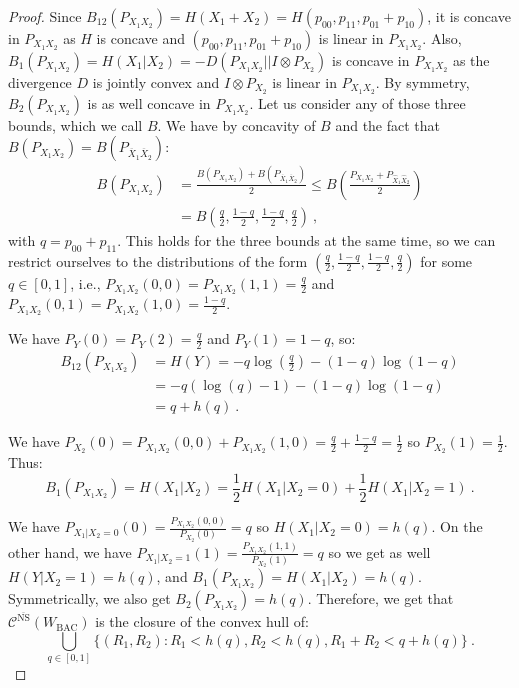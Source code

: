 \begin{proof}
    Since $B_{12}(P_{X_1X_2}) = H(X_1+X_2) = H(p_{00},p_{11},p_{01}+p_{10})$, it is concave in $P_{X_1X_2}$ as $H$ is concave and $(p_{00},p_{11},p_{01}+p_{10})$ is linear in $P_{X_1X_2}$. Also, $B_1(P_{X_1X_2}) = H(X_1|X_2) = -D(P_{X_1X_2} ||I \otimes P_{X_2})$ is concave in $P_{X_1X_2}$  as the divergence $D$ is jointly convex and $I \otimes P_{X_2}$ is linear in $P_{X_1X_2}$. By symmetry, $B_2(P_{X_1X_2})$ is as well concave in $P_{X_1X_2}$. Let us consider any of those three bounds, which we call $B$. We have by concavity of $B$ and the fact that $B(P_{X_1X_2})=B(P_{\overline{X}_1\overline{X}_2})$:
    \begin{equation}
      \begin{aligned}
        B(P_{X_1X_2})& = \frac{B(P_{X_1X_2})+B(P_{\overline{X}_1\overline{X}_2})}{2} \leq B\left(\frac{P_{X_1X_2}+P_{\hat{X}_1\hat{X}_2}}{2}\right)\\
        &= B\left(\frac{q}{2},\frac{1-q}{2},\frac{1-q}{2},\frac{q}{2}\right) \ ,
      \end{aligned}
    \end{equation}
    with $q=p_{00}+p_{11}$. This holds for the three bounds at the same time, so we can restrict ourselves to the distributions of the form $\left(\frac{q}{2},\frac{1-q}{2},\frac{1-q}{2},\frac{q}{2}\right)$ for some $q \in [0,1]$, i.e., $P_{X_1X_2}(0,0) = P_{X_1X_2}(1,1) = \frac{q}{2}$ and $P_{X_1X_2}(0,1) = P_{X_1X_2}(1,0) = \frac{1-q}{2}$.

     We have $P_{Y}(0) = P_{Y}(2) = \frac{q}{2}$ and $P_{Y}(1) = 1-q$, so:
    \begin{equation}
      \begin{aligned}
        B_{12}(P_{X_1X_2}) &= H(Y) = -q\log(\frac{q}{2})-\left(1-q\right)\log(1-q)\\
        &= -q\left(\log(q)-1\right)-\left(1-q\right)\log(1-q)\\
        &= q+h\left(q\right) \ .
      \end{aligned}
    \end{equation}
    
    We have $P_{X_2}(0) = P_{X_1X_2}(0,0)+P_{X_1X_2}(1,0) = \frac{q}{2}+\frac{1-q}{2} = \frac{1}{2}$ so $P_{X_2}(1) = \frac{1}{2}$. Thus:
    \[ B_1(P_{X_1X_2}) = H(X_1|X_2) = \frac{1}{2}H(X_1|X_2=0)+\frac{1}{2}H(X_1|X_2=1) \ .\]
    
    We have $P_{X_1|X_2=0}(0)=\frac{P_{X_1X_2}(0,0)}{P_{X_2}(0)} = q$ so $H(X_1|X_2=0)=h\left(q\right)$. On the other hand, we have $P_{X_1|X_2=1}(1)=\frac{P_{X_1X_2}(1,1)}{P_{X_2}(1)} = q$ so we get as well $H(Y|X_2=1)=h\left(q\right)$, and $B_1(P_{X_1X_2}) = H(X_1|X_2) = h\left(q\right)$. Symmetrically, we also get $B_2(P_{X_1X_2}) = h\left(q\right)$. Therefore, we get that $\mathcal{C}^{\overline{\mathrm{NS}}}(W_{\text{BAC}})$ is the closure of the convex hull of:
    \[\bigcup_{q \in [0,1]}\{ (R_1,R_2) : R_1 < h\left(q\right), R_2 < h\left(q\right), R_1+R_2 < q+h\left(q\right)\} \ .\]


\end{proof}
